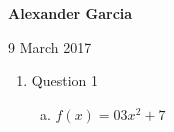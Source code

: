 \documentclass[11pt]{article}
\begin{document}
\textbf{Alexander Garcia}

9 March 2017

\begin{enumerate}

	\item Question 1

		\begin{enumerate}[(a)]
			\item $f(x) = 03x^2 + 7$
		\end{enumerate}

\end{enumerate}
\end{document}
